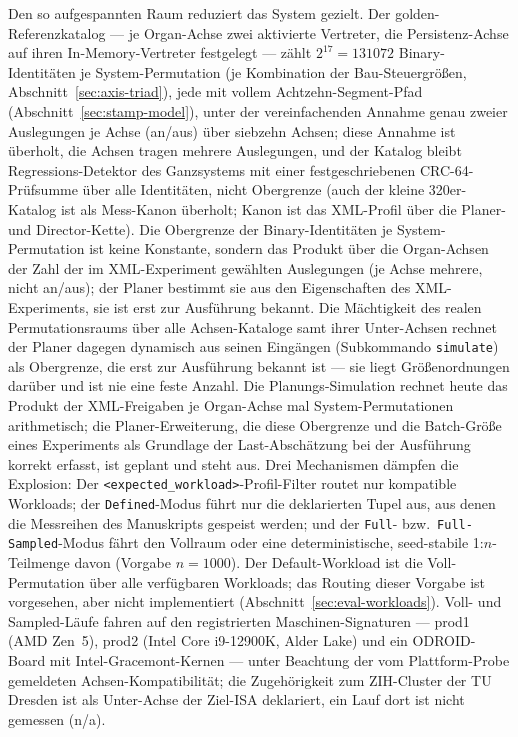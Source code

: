 \begin{nurlang}
Den so aufgespannten Raum reduziert das System gezielt. Der golden-Referenzkatalog --- je Organ-Achse
zwei aktivierte Vertreter, die Persistenz-Achse auf ihren In-Memory-Vertreter festgelegt --- zählt
$2^{17} = 131072$ Binary-Identitäten je System-Permutation (je Kombination der Bau-Steuergrößen,
Abschnitt~\ref{sec:axis-triad}), jede mit vollem Achtzehn-Segment-Pfad (Abschnitt~\ref{sec:stamp-model}),
unter der vereinfachenden Annahme genau zweier Auslegungen je Achse (an/aus) über siebzehn Achsen; diese
Annahme ist überholt, die Achsen tragen mehrere Auslegungen, und der Katalog bleibt Regressions-Detektor des
Ganzsystems mit einer festgeschriebenen CRC-64-Prüfsumme über alle Identitäten, nicht Obergrenze (auch der
kleine 320er-Katalog ist als Mess-Kanon überholt; Kanon ist das XML-Profil über die Planer- und
Director-Kette). Die Obergrenze der Binary-Identitäten je System-Permutation ist keine Konstante, sondern das
Produkt über die Organ-Achsen der Zahl der im XML-Experiment gewählten Auslegungen (je Achse mehrere, nicht
an/aus); der Planer bestimmt sie aus den Eigenschaften des XML-Experiments, sie ist erst zur Ausführung
bekannt. Die Mächtigkeit des realen Permutationsraums über alle Achsen-Kataloge samt ihrer Unter-Achsen
rechnet der Planer dagegen dynamisch aus seinen Eingängen (Subkommando \texttt{simulate}) als Obergrenze,
die erst zur Ausführung bekannt ist --- sie liegt Größenordnungen darüber und ist nie eine feste Anzahl. Die
Planungs-Simulation rechnet heute das Produkt der XML-Freigaben je Organ-Achse mal System-Permutationen
arithmetisch; die Planer-Erweiterung, die diese Obergrenze und die Batch-Größe eines Experiments als
Grundlage der Last-Abschätzung bei der Ausführung korrekt erfasst, ist geplant und steht aus. Drei Mechanismen dämpfen die Explosion: Der \texttt{<expected\_workload>}-Profil-Filter routet
nur kompatible Workloads; der \texttt{Defined}-Modus führt nur die deklarierten Tupel aus, aus denen
die Messreihen des Manuskripts gespeist werden; und der \texttt{Full}- bzw.\ \texttt{Full-Sampled}-Modus
fährt den Vollraum oder eine deterministische, seed-stabile 1:$n$-Teilmenge davon (Vorgabe $n = 1000$).
Der Default-Workload ist die Voll-Permutation über alle verfügbaren Workloads; das Routing dieser
Vorgabe ist vorgesehen, aber nicht implementiert (Abschnitt~\ref{sec:eval-workloads}). Voll- und Sampled-Läufe fahren auf den registrierten
Maschinen-Signaturen --- prod1 (AMD Zen~5), prod2 (Intel Core i9-12900K, Alder Lake) und ein
ODROID-Board mit Intel-Gracemont-Kernen --- unter Beachtung der vom Plattform-Probe gemeldeten
Achsen-Kompatibilität; die Zugehörigkeit zum ZIH-Cluster der TU Dresden ist als Unter-Achse der
Ziel-ISA deklariert, ein Lauf dort ist nicht gemessen (n/a).
\end{nurlang}
